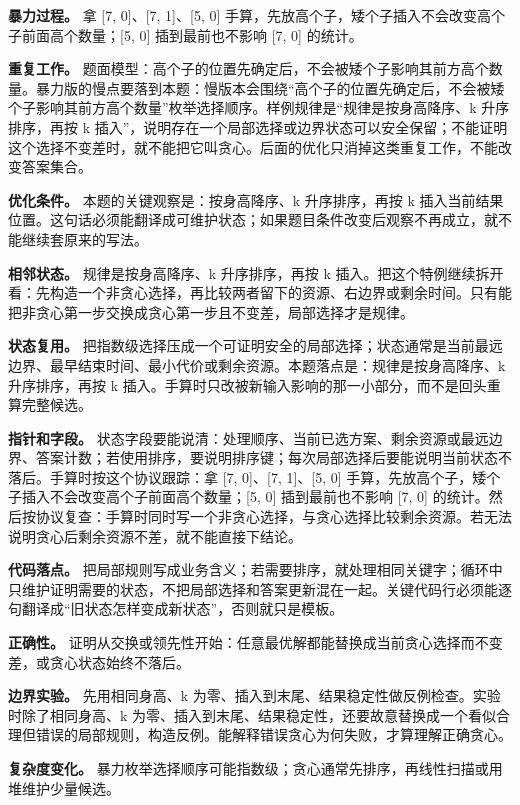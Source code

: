 \textbf{暴力过程。} 拿 [7, 0]、[7, 1]、[5, 0] 手算，先放高个子，矮个子插入不会改变高个子前面高个数量；[5, 0] 插到最前也不影响 [7, 0] 的统计。

\textbf{重复工作。} 题面模型：高个子的位置先确定后，不会被矮个子影响其前方高个数量。暴力版的慢点要落到本题：慢版本会围绕“高个子的位置先确定后，不会被矮个子影响其前方高个数量”枚举选择顺序。样例规律是“规律是按身高降序、k 升序排序，再按 k 插入”，说明存在一个局部选择或边界状态可以安全保留；不能证明这个选择不变差时，就不能把它叫贪心。后面的优化只消掉这类重复工作，不能改变答案集合。

\textbf{优化条件。} 本题的关键观察是：按身高降序、k 升序排序，再按 k 插入当前结果位置。这句话必须能翻译成可维护状态；如果题目条件改变后观察不再成立，就不能继续套原来的写法。

\textbf{相邻状态。} 规律是按身高降序、k 升序排序，再按 k 插入。把这个特例继续拆开看：先构造一个非贪心选择，再比较两者留下的资源、右边界或剩余时间。只有能把非贪心第一步交换成贪心第一步且不变差，局部选择才是规律。

\textbf{状态复用。} 把指数级选择压成一个可证明安全的局部选择；状态通常是当前最远边界、最早结束时间、最小代价或剩余资源。本题落点是：规律是按身高降序、k 升序排序，再按 k 插入。手算时只改被新输入影响的那一小部分，而不是回头重算完整候选。

\textbf{指针和字段。} 状态字段要能说清：处理顺序、当前已选方案、剩余资源或最远边界、答案计数；若使用排序，要说明排序键；每次局部选择后要能说明当前状态不落后。手算时按这个协议跟踪：拿 [7, 0]、[7, 1]、[5, 0] 手算，先放高个子，矮个子插入不会改变高个子前面高个数量；[5, 0] 插到最前也不影响 [7, 0] 的统计。然后按协议复查：手算时同时写一个非贪心选择，与贪心选择比较剩余资源。若无法说明贪心后剩余资源不差，就不能直接下结论。

\textbf{代码落点。} 把局部规则写成业务含义；若需要排序，就处理相同关键字；循环中只维护证明需要的状态，不把局部选择和答案更新混在一起。关键代码行必须能逐句翻译成“旧状态怎样变成新状态”，否则就只是模板。

\textbf{正确性。} 证明从交换或领先性开始：任意最优解都能替换成当前贪心选择而不变差，或贪心状态始终不落后。

\textbf{边界实验。} 先用相同身高、k 为零、插入到末尾、结果稳定性做反例检查。实验时除了相同身高、k 为零、插入到末尾、结果稳定性，还要故意替换成一个看似合理但错误的局部规则，构造反例。能解释错误贪心为何失败，才算理解正确贪心。

\textbf{复杂度变化。} 暴力枚举选择顺序可能指数级；贪心通常先排序，再线性扫描或用堆维护少量候选。

